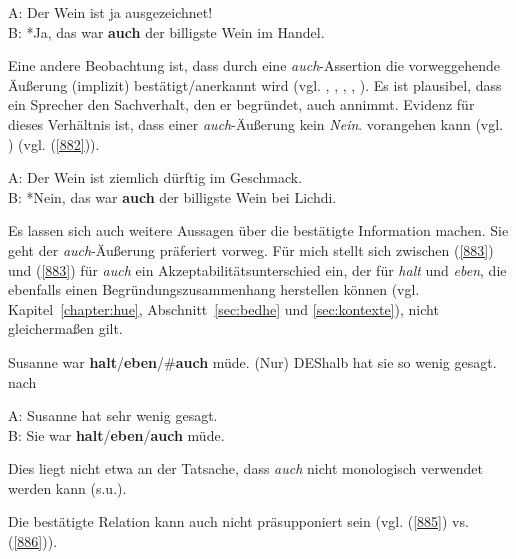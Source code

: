 {\begin{exe}
	\ex\label{881}
	A: Der Wein ist ja ausgezeichnet!\\
	B: *Ja, das war \textbf{auch} der billigste Wein im Handel.	 
	\hfill\hbox {\citet[211]{Franck1980}}
\end{exe}
Eine andere Beobachtung ist, dass durch eine \textit{auch}-Assertion die vorweggehende Äußerung (implizit) bestätigt/anerkannt wird (vgl. \citealt[212]{Franck1980}, \citealt[160]{Thurmair1989}, \citealt[88]{Helbig1990}, \citealt[221-222]{Moellering2004}, \citealt[343]{Karagjosova2004}). Es ist plausibel, dass ein Sprecher den Sachverhalt, den er begründet, auch annimmt. Evidenz für dieses Verhältnis ist, dass einer \textit{auch}-Äußerung kein \textit{Nein}. vorangehen kann (vgl. \citealt[212]{Franck1980}) (vgl. (\ref{882})).

\begin{exe}
	\ex\label{882}
	A: Der Wein ist ziemlich dürftig im Geschmack.\\
	B: *Nein, das war \textbf{auch} der billigste Wein bei Lichdi.	 
	\hfill\hbox {\citet[211]{Franck1980}}
\end{exe}
Es lassen sich auch weitere Aussagen über die bestätigte Information machen. Sie geht der \textit{auch}-Äußerung präferiert vorweg. Für mich stellt sich zwischen (\ref{883}) und (\ref{883}) für \textit{auch} ein Akzeptabilitätsunterschied ein, der für \textit{halt} und \textit{eben}, die ebenfalls einen Begründungszusammenhang herstellen können (vgl. Kapitel~\ref{chapter:hue}, Abschnitt~\ref{sec:bedhe} und \ref{sec:kontexte}), nicht gleichermaßen gilt.

\begin{exe}
	\ex\label{883}
	Susanne war \textbf{halt}/\textbf{eben}/\#\textbf{auch} müde. (Nur) DEShalb hat sie so wenig gesagt.	 
	\newline
	\hbox{}\hfill\hbox {nach \citet[89]{Autenrieth2002}}
\end{exe}

\begin{exe}
	\ex\label{884}
	A: Susanne hat sehr wenig gesagt.\\
	B: Sie war \textbf{halt}/\textbf{eben}/\textbf{auch} müde.
\end{exe}
Dies liegt nicht etwa an der Tatsache, dass \textit{auch} nicht monologisch verwendet werden kann (s.u.). 

Die bestätigte Relation kann auch nicht präsupponiert  sein (vgl. (\ref{885}) vs. (\ref{886})).

}
